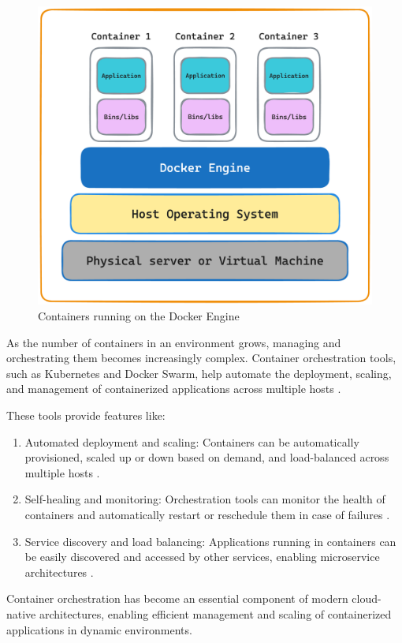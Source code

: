 \documentclass[
  table]{report}
\providecommand{\tightlist}{%
  \setlength{\itemsep}{0pt}\setlength{\parskip}{0pt}}
\begin{document}
\begin{figure}[H]
\centering
  \includegraphics[width=0.7\columnwidth]{assets/3.3-container-figure.png}
  \caption{Containers running on the Docker Engine}
  \label{container-figure}
\end{figure}

As the number of containers in an environment grows, managing and
orchestrating them becomes increasingly complex. Container orchestration
tools, such as Kubernetes and Docker Swarm, help automate the
deployment, scaling, and management of containerized applications across
multiple hosts \citep{burnsBorgOmegaKubernetes2016}.

These tools provide features like:

\begin{enumerate}
\def\labelenumi{\arabic{enumi}.}
\tightlist
\item
  Automated deployment and scaling: Containers can be automatically
  provisioned, scaled up or down based on demand, and load-balanced
  across multiple hosts \citep{burnsBorgOmegaKubernetes2016}.
\item
  Self-healing and monitoring: Orchestration tools can monitor the
  health of containers and automatically restart or reschedule them in
  case of failures \citep{kubernetesKubernetes}.
\item
  Service discovery and load balancing: Applications running in
  containers can be easily discovered and accessed by other services,
  enabling microservice architectures \citep{kubernetesKubernetes}.
\end{enumerate}

Container orchestration has become an essential component of modern
cloud-native architectures, enabling efficient management and scaling of
containerized applications in dynamic environments.
\end{document}
